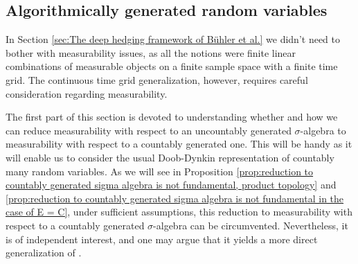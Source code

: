 \documentclass[11pt,a4paper,twoside,openany]{report}
\numberwithin{equation}{section}
\theoremstyle{plain} %
\theoremstyle{definition} %
\theoremstyle{remark} %
\let\parencite\authnumparencite
\begin{document}
 \subsection{Algorithmically generated random variables}\label{sec:algorithmically generated random variables}
 In Section \ref{sec:The deep hedging framework of Bühler et al.} we didn't need to bother with measurability issues, as all the notions were finite linear combinations of measurable objects on a finite sample space with a finite time grid. The continuous time grid generalization, however, requires careful consideration regarding measurability. 

 
 The first part of this section is devoted to understanding whether and how we can reduce measurability with respect to an uncountably generated \(\sigma\)-algebra to measurability with respect to a countably generated one. This will be handy as it will enable us to consider the usual Doob-Dynkin representation of countably many random variables. As we will see in Proposition \ref{prop:reduction to countably generated sigma algebra is not fundamental, product topology} and \ref{prop:reduction to countably generated sigma algebra is not fundamental in the case of E = C}, under sufficient assumptions, this reduction to measurability with respect to a countably generated \(\sigma\)-algebra can be circumvented. Nevertheless, it is of independent interest, and one may argue that it yields a more direct generalization of \parencite{Buehler2018DeepHedging}.
\end{document}
